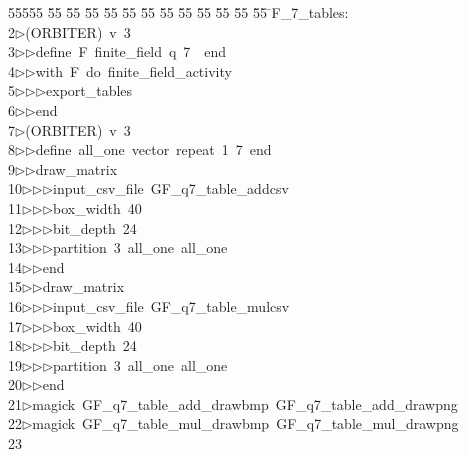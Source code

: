 %
%
\begin{tabbing}
55555 \= 55 \= 55 \= 55 \= 55 \= 55 \= 55 \= 55 \= 55 \= 55 \= 55 \= 55 \= 55 \= \>F\_7\_tables:\\[0pt]
2\>$\triangleright$\>(ORBITER)\ v\ 3\ \\[0pt]
3\>$\triangleright$\>$\triangleright$\>define\ F\ finite\_field\ q\ 7\ \ end\ \\[0pt]
4\>$\triangleright$\>$\triangleright$\>with\ F\ do\ finite\_field\_activity\ \\[0pt]
5\>$\triangleright$\>$\triangleright$\>$\triangleright$\>export\_tables\ \\[0pt]
6\>$\triangleright$\>$\triangleright$\>end\\[0pt]
7\>$\triangleright$\>(ORBITER)\ v\ 3\ \\[0pt]
8\>$\triangleright$\>$\triangleright$\>define\ all\_one\ vector\ repeat\ 1\ 7\ end\ \\[0pt]
9\>$\triangleright$\>$\triangleright$\>draw\_matrix\ \\[0pt]
10\>$\triangleright$\>$\triangleright$\>$\triangleright$\>input\_csv\_file\ GF\_q7\_table\_addcsv\ \\[0pt]
11\>$\triangleright$\>$\triangleright$\>$\triangleright$\>box\_width\ 40\ \\[0pt]
12\>$\triangleright$\>$\triangleright$\>$\triangleright$\>bit\_depth\ 24\ \\[0pt]
13\>$\triangleright$\>$\triangleright$\>$\triangleright$\>partition\ 3\ all\_one\ all\_one\ \\[0pt]
14\>$\triangleright$\>$\triangleright$\>end\ \\[0pt]
15\>$\triangleright$\>$\triangleright$\>draw\_matrix\ \\[0pt]
16\>$\triangleright$\>$\triangleright$\>$\triangleright$\>input\_csv\_file\ GF\_q7\_table\_mulcsv\ \\[0pt]
17\>$\triangleright$\>$\triangleright$\>$\triangleright$\>box\_width\ 40\ \\[0pt]
18\>$\triangleright$\>$\triangleright$\>$\triangleright$\>bit\_depth\ 24\ \\[0pt]
19\>$\triangleright$\>$\triangleright$\>$\triangleright$\>partition\ 3\ all\_one\ all\_one\ \\[0pt]
20\>$\triangleright$\>$\triangleright$\>end\\[0pt]
21\>$\triangleright$\>magick\ GF\_q7\_table\_add\_drawbmp\ GF\_q7\_table\_add\_drawpng\\[0pt]
22\>$\triangleright$\>magick\ GF\_q7\_table\_mul\_drawbmp\ GF\_q7\_table\_mul\_drawpng\\[0pt]
23\>\end{tabbing}
